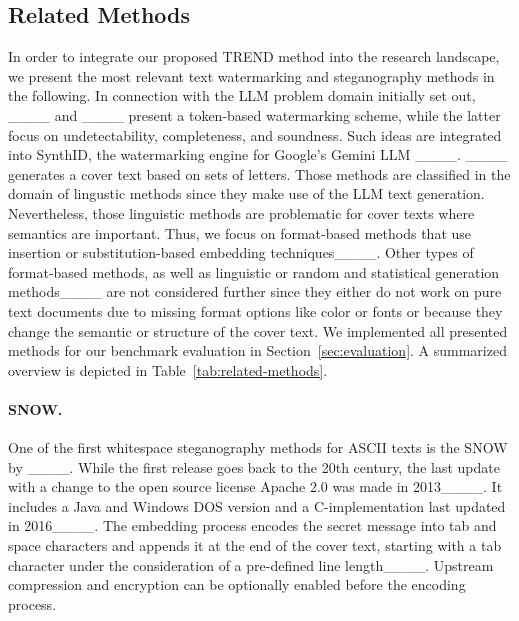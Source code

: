 	\subsection{Related Methods}
	\label{sec:related-methods}
	In order to integrate our proposed TREND method into the research landscape, we present the most relevant text watermarking and steganography methods in the following. In connection with the \ac{LLM} problem domain initially set out, ____ and ____ present a token-based watermarking scheme, while the latter focus on undetectability, completeness, and soundness. Such ideas are integrated into SynthID, the watermarking engine for Google's Gemini \ac{LLM} ____. ____ generates a cover text based on sets of letters. Those methods are classified in the domain of lingustic methods since they make use of the \ac{LLM} text generation. Nevertheless, those linguistic methods are problematic for cover texts where semantics are important. Thus, we focus on format-based methods that use insertion or substitution-based embedding techniques____. Other types of format-based methods, as well as linguistic or random and statistical generation methods____ are not considered further since they either do not work on pure text documents due to missing format options like color or fonts or because they change the semantic or structure of the cover text. We implemented all presented methods for our benchmark evaluation in Section~\ref{sec:evaluation}. A summarized overview is depicted in Table~\ref{tab:related-methods}.
	
	\paragraph{SNOW.} One of the first whitespace steganography methods for ASCII texts is the \ac{SNOW} by ____. While the first release goes back to the 20th century, the last update with a change to the open source license Apache 2.0 was made in 2013____. It includes a Java and Windows DOS version and a C-implementation last updated in 2016____. The embedding process encodes the secret message into tab and space characters and appends it at the end of the cover text, starting with a tab character under the consideration of a pre-defined line length____. Upstream compression and encryption can be optionally enabled before the encoding process.
	
